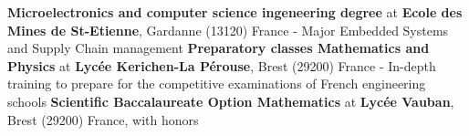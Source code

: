 %
%
%


\begin{scholarship}
					{\textbf{Microelectronics and computer science ingeneering degree} at \textbf{Ecole des Mines de St-Etienne}, Gardanne (13120) France - Major Embedded Systems and Supply Chain management}
					{\textbf{Preparatory classes Mathematics and Physics} at \textbf{Lycée Kerichen-La Pérouse}, Brest (29200) France - \phantom{bid} In-depth training to prepare for the competitive examinations of French engineering schools}
					{\textbf{Scientific Baccalaureate Option Mathematics} at \textbf{Lycée Vauban}, Brest (29200) France, with honors}
\end{scholarship}